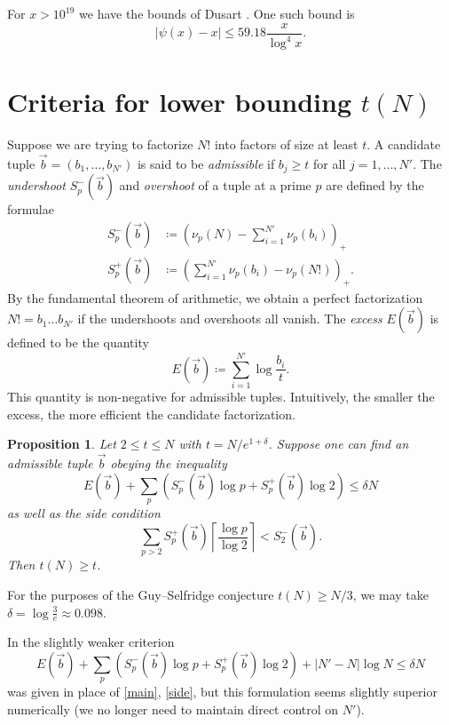 \documentclass[12pt,a4paper,reqno]{amsart}
\numberwithin{equation}{section}
\theoremstyle{plain}
\newtheorem{proposition}[theorem]{Proposition}
\theoremstyle{definition}
\begin{document}
  For $x > 10^{19}$ we have the bounds of Dusart \cite{dusart}.  One such bound is
  $$ |\psi(x) - x| \leq 59.18 \frac{x}{\log^4 x}.$$
  
  

  
\section{Criteria for lower bounding $t(N)$}

Suppose we are trying to factorize $N!$ into factors of size at least $t$.  A candidate tuple $\vec b = (b_1,\dots,b_{N'})$ is said to be \emph{admissible} if $b_j \geq t$ for all $j=1,\dots,N'$.  The \emph{undershoot} $S^-_p(\vec b)$ and \emph{overshoot} of a tuple at a prime $p$ are defined by the formulae
\begin{align*}
   S^-_p(\vec b) &\coloneqq (\nu_p(N) - \sum_{i=1}^{N'} \nu_p(b_i))_+ \\
   S^+_p(\vec b) &\coloneqq (\sum_{i=1}^{N'} \nu_p(b_i) - \nu_p(N!))_+.
\end{align*}
By the fundamental theorem of arithmetic, we obtain a perfect factorization $N! = b_1 \dots b_{N'}$ if the undershoots and overshoots all vanish.  The \emph{excess} $E(\vec b)$ is defined to be the quantity
\begin{equation}\label{excess} 
  E(\vec b) \coloneqq \sum_{i=1}^{N'} \log \frac{b_i}{t}.
\end{equation}
This quantity is non-negative for admissible tuples.  Intuitively, the smaller the excess, the more efficient the candidate factorization.

\begin{proposition}  Let $2 \leq t \leq N$ with $t = N /e^{1+\delta}$.  Suppose one can find an admissible tuple $\vec b$ obeying the inequality
\begin{equation}\label{main} 
  E(\vec b) + \sum_p (S^-_p(\vec b) \log p + S^+_p(\vec b) \log 2) \leq \delta N
\end{equation}
as well as the side condition
\begin{equation}\label{side}
 \sum_{p>2} S^+_p(\vec b) \left\lceil \frac{\log p}{\log 2} \right\rceil < S^-_2(\vec b).
\end{equation}
Then $t(N) \geq t$.
\end{proposition}

For the purposes of the Guy--Selfridge conjecture $t(N) \geq N/3$, we may take $\delta = \log \frac{3}{e} \approx 0.098$.  

In \cite[Proposition 3.1]{tao} the slightly weaker criterion
$$ 
E(\vec b)  + \sum_p (S^-_p(\vec b) \log p + S^+_p(\vec b) \log 2) + |N'-N| \log N \leq \delta N$$
was given in place of \eqref{main}, \eqref{side}, but this formulation seems slightly superior numerically (we no longer need to maintain direct control on $N'$).
\end{document}
